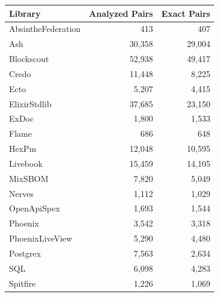 \begin{tabular}{|l|r|r|}
\hline
\textbf{Library} & \textbf{Analyzed Pairs} & \textbf{Exact Pairs} \\
\hline
AbsintheFederation & 413 & 407 \\
Ash & 30,358 & 29,004 \\
Blockscout & 52,938 & 49,417 \\
Credo & 11,448 & 8,225 \\
Ecto & 5,207 & 4,415 \\
ElixirStdlib & 37,685 & 23,150 \\
ExDoc & 1,800 & 1,533 \\
Flame & 686 & 648 \\
HexPm & 12,048 & 10,595 \\
Livebook & 15,459 & 14,105 \\
MixSBOM & 7,820 & 5,049 \\
Nerves & 1,112 & 1,029 \\
OpenApiSpex & 1,693 & 1,544 \\
Phoenix & 3,542 & 3,318 \\
PhoenixLiveView & 5,290 & 4,480 \\
Postgrex & 7,563 & 2,634 \\
SQL & 6,098 & 4,283 \\
Spitfire & 1,226 & 1,069 \\
\hline
\end{tabular}
